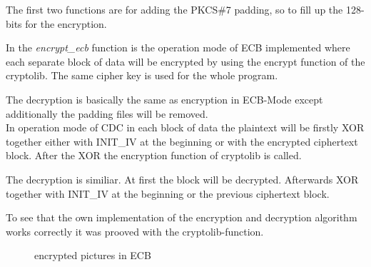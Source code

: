 The first two functions are for adding the PKCS\#7 padding, so to fill up the 128-bits for the encryption. 

In the \textit{encrypt\_ecb} function is the operation mode of ECB implemented where each separate block of data will be encrypted by using the encrypt function of the cryptolib. The same cipher key is used for the whole program.

The decryption is basically the same as encryption in ECB-Mode except additionally the padding files will be removed. \\

In operation mode of CDC in each block of data the plaintext will be firstly XOR together either with INIT\_IV at the beginning or with the encrypted ciphertext block. After the XOR the encryption function of cryptolib is called.

The decryption is similiar. At first the block will be decrypted. Afterwards XOR together with INIT\_IV at the beginning or the previous ciphertext block.

To see that the own implementation of the encryption and decryption algorithm works correctly it was prooved with the cryptolib-function.


\begin{figure}[htp]
    \centering
    \caption{encrypted pictures in ECB}
\end{figure}


